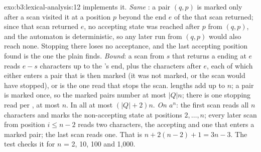 \begin{solution}{exo:b3:lexical-analysis:12}
 implements it. \emph{Same }: a pair $(q, p)$ is marked only after a scan visited it at a position $p$ beyond the end $e$ of the  that scan returned; since that scan returned $e$, no accepting state was reached after $p$ from $(q, p)$, and the automaton is deterministic, so any later run from $(q, p)$ would also reach none. Stopping there loses no acceptance, and the last accepting position found is the one the plain  finds. \emph{Bound}: a scan from $s$ that returns a  ending at $e$ reads $e - s$ characters up to the 's end, plus the characters after $e$, each of which either enters a pair that is then marked (it was not marked, or the scan would have stopped), or is the one read that stops the scan.  lengths add up to $n$; a pair is marked once, so the marked pairs number at most $|Q|n$; there is one stopping read per , at most $n$. In all at most $(|Q| + 2)n$. \emph{On $a^n$}: the first scan reads all $n$ characters and marks the non-accepting state at positions $2, \dots, n$; every later scan from position $i \le n - 2$ reads two characters, the accepting  and one that enters a marked pair; the last scan reads one. That is $n + 2(n - 2) + 1 = 3n - 3$. The test  checks it for $n$ = 2, 10, 100 and 1,000.
\end{solution}

